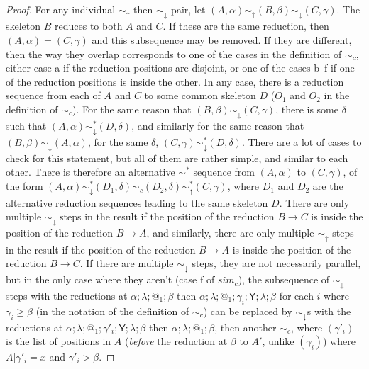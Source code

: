 \documentclass{article}
\newcommand{\tY}{\mathsf{Y}}
\theoremstyle{definition}
\theoremstyle{lemma}
\theoremstyle{remark}
\begin{document}
\begin{proof}
  For any individual $\sim_\uparrow$ then $\sim_\downarrow$ pair, let $(A,\alpha) \sim_\uparrow (B,\beta) \sim_\downarrow (C,\gamma)$. The skeleton $B$ reduces to both $A$ and $C$. If these are the same reduction, then $(A,\alpha) = (C,\gamma)$ and this subsequence may be removed. If they are different, then the way they overlap corresponds to one of the cases in the definition of $\sim_c$, either case a if the reduction positions are disjoint, or one of the cases b--f if one of the reduction positions is inside the other. In any case, there is a reduction sequence from each of $A$ and $C$ to some common skeleton $D$ ($O_1$ and $O_2$ in the definition of $\sim_c$). For the same reason that $(B,\beta) \sim_\downarrow (C,\gamma)$, there is some $\delta$ such that $(A,\alpha) \sim_\downarrow^* (D,\delta)$, and similarly for the same reason that $(B,\beta) \sim_\downarrow (A,\alpha)$, for the same $\delta$, $(C,\gamma) \sim_\downarrow^* (D,\delta)$. There are a lot of cases to check for this statement, but all of them are rather simple, and similar to each other. There is therefore an alternative $\sim^*$ sequence from $(A,\alpha)$ to $(C,\gamma)$, of the form $(A,\alpha) \sim_\downarrow^* (D_1,\delta) \sim_c (D_2,\delta) \sim_\uparrow^* (C,\gamma)$, where $D_1$ and $D_2$ are the alternative reduction sequences leading to the same skeleton $D$. There are only multiple $\sim_\downarrow$ steps in the result if the position of the reduction $B \to C$ is inside the position of the reduction $B \to A$, and similarly, there are only multiple $\sim_\uparrow$ steps in the result if the position of the reduction $B \to A$ is inside the position of the reduction $B \to C$. If there are multiple $\sim_\downarrow$ steps, they are not necessarily parallel, but in the only case where they aren't (case f of $sim_c$), the subsequence of $\sim_\downarrow$ steps with the reductions at $\alpha;\lambda;@_1;\beta$ then $\alpha;\lambda;@_1;\gamma_i;\tY;\lambda;\beta$ for each $i$ where $\gamma_i \geq \beta$ (in the notation of the definition of $\sim_c$) can be replaced by $\sim_\downarrow$s with the reductions at $\alpha;\lambda;@_1;\gamma'_i;\tY;\lambda;\beta$ then $\alpha;\lambda;@_1;\beta$, then another $\sim_c$, where $(\gamma'_i)$ is the list of positions in $A$ (\emph{before} the reduction at $\beta$ to $A'$, unlike $(\gamma_i)$) where $A | \gamma'_i = x$ and $\gamma'_i > \beta$.


\end{proof}
\end{document}
